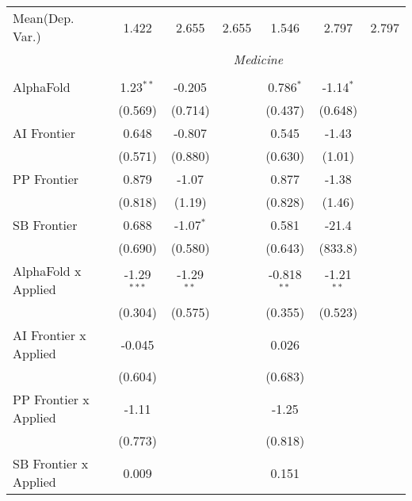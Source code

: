 \begin{tabular}{lcccccc}
Mean(Dep. Var.) & 1.422 & 2.655 & 2.655 & 1.546 & 2.797 & 2.797 \\
 & \multicolumn{6}{c}{\textit{Medicine}} \\ \\
   AlphaFold                    & 1.23$^{**}$   & -0.205       &               & 0.786$^{*}$   & -1.14$^{*}$  &   \\   
                                & (0.569)       & (0.714)      &               & (0.437)       & (0.648)      &   \\   
   AI Frontier                  & 0.648         & -0.807       &               & 0.545         & -1.43        &   \\   
                                & (0.571)       & (0.880)      &               & (0.630)       & (1.01)       &   \\   
   PP Frontier                  & 0.879         & -1.07        &               & 0.877         & -1.38        &   \\   
                                & (0.818)       & (1.19)       &               & (0.828)       & (1.46)       &   \\   
   SB Frontier                  & 0.688         & -1.07$^{*}$  &               & 0.581         & -21.4        &   \\   
                                & (0.690)       & (0.580)      &               & (0.643)       & (833.8)      &   \\   
   AlphaFold x Applied          & -1.29$^{***}$ & -1.29$^{**}$ &               & -0.818$^{**}$ & -1.21$^{**}$ &   \\   
                                & (0.304)       & (0.575)      &               & (0.355)       & (0.523)      &   \\   
   AI Frontier x Applied        & -0.045        &              &               & 0.026         &              &   \\   
                                & (0.604)       &              &               & (0.683)       &              &   \\   
   PP Frontier x Applied        & -1.11         &              &               & -1.25         &              &   \\   
                                & (0.773)       &              &               & (0.818)       &              &   \\   
   SB Frontier x Applied        & 0.009         &              &               & 0.151         &              &   \\   

\end{tabular}
